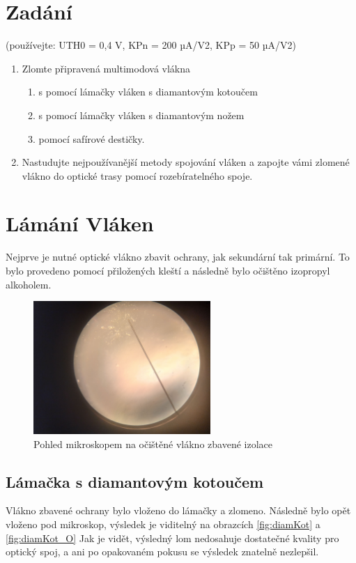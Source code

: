 \section{Zadání}
(používejte: UTH0 = 0,4 V, KPn = 200 µA/V2, KPp = 50 µA/V2)

\begin{enumerate}
    \item Zlomte připravená multimodová vlákna
    \begin{enumerate}
        \renewcommand{\labelenumi}{\alph{enumi})}
        \item s pomocí lámačky vláken s diamantovým kotoučem
        \item s pomocí lámačky vláken s diamantovým nožem
        \item pomocí safírové destičky.
    \end{enumerate}
    \item Nastudujte nejpoužívanější metody spojování vláken a zapojte vámi zlomené vlákno do optické trasy pomocí rozebíratelného spoje.    
\end{enumerate}


\newpage
\section{Lámání Vláken}
  Nejprve je nutné optické vlákno zbavit ochrany, jak sekundární tak primární.
  To bylo provedeno pomocí přiložených kleští a následně bylo očištěno izopropyl alkoholem.
  
  \begin{figure}[h!]
    \centering
    \includegraphics[width=0.6\textwidth]{text/img/odizolovano.jpg}
    \caption{\label{fig:odizolovano} Pohled mikroskopem na očištěné vlákno zbavené izolace}
  \end{figure}
  
  \subsection{Lámačka s diamantovým kotoučem}
    Vlákno zbavené ochrany bylo vloženo do lámačky a zlomeno.
    Následně bylo opět vloženo pod mikroskop, výsledek je viditelný na obrazcích \ref{fig:diamKot} a \ref{fig:diamKot_O}
    Jak je vidět, výsledný lom nedosahuje dostatečné kvality pro optický spoj, a ani po opakovaném pokusu se výsledek znatelně nezlepšil.  

